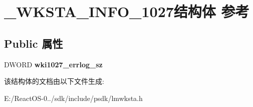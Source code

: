 \hypertarget{struct___w_k_s_t_a___i_n_f_o__1027}{}\section{\+\_\+\+W\+K\+S\+T\+A\+\_\+\+I\+N\+F\+O\+\_\+1027结构体 参考}
\label{struct___w_k_s_t_a___i_n_f_o__1027}
\subsection*{Public 属性}
\begin{DoxyCompactItemize}
\item 
\mbox{\label{struct___w_k_s_t_a___i_n_f_o__1027_abeb060eae9d183e516ef69bcf61beb26}} 
D\+W\+O\+RD {\bfseries wki1027\+\_\+errlog\+\_\+sz}
\end{DoxyCompactItemize}


该结构体的文档由以下文件生成\+:\begin{DoxyCompactItemize}
\item 
E\+:/\+React\+O\+S-\/0../sdk/include/psdk/lmwksta.\+h\end{DoxyCompactItemize}
